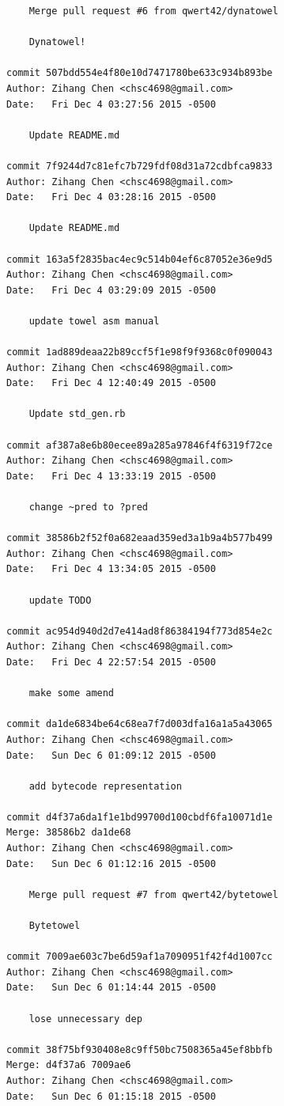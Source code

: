 \documentclass{report}
\begin{document}
\begin{appendices}
\begin{verbatim}
    Merge pull request #6 from qwert42/dynatowel
    
    Dynatowel!

commit 507bdd554e4f80e10d7471780be633c934b893be
Author: Zihang Chen <chsc4698@gmail.com>
Date:   Fri Dec 4 03:27:56 2015 -0500

    Update README.md

commit 7f9244d7c81efc7b729fdf08d31a72cdbfca9833
Author: Zihang Chen <chsc4698@gmail.com>
Date:   Fri Dec 4 03:28:16 2015 -0500

    Update README.md

commit 163a5f2835bac4ec9c514b04ef6c87052e36e9d5
Author: Zihang Chen <chsc4698@gmail.com>
Date:   Fri Dec 4 03:29:09 2015 -0500

    update towel asm manual

commit 1ad889deaa22b89ccf5f1e98f9f9368c0f090043
Author: Zihang Chen <chsc4698@gmail.com>
Date:   Fri Dec 4 12:40:49 2015 -0500

    Update std_gen.rb

commit af387a8e6b80ecee89a285a97846f4f6319f72ce
Author: Zihang Chen <chsc4698@gmail.com>
Date:   Fri Dec 4 13:33:19 2015 -0500

    change ~pred to ?pred

commit 38586b2f52f0a682eaad359ed3a1b9a4b577b499
Author: Zihang Chen <chsc4698@gmail.com>
Date:   Fri Dec 4 13:34:05 2015 -0500

    update TODO

commit ac954d940d2d7e414ad8f86384194f773d854e2c
Author: Zihang Chen <chsc4698@gmail.com>
Date:   Fri Dec 4 22:57:54 2015 -0500

    make some amend

commit da1de6834be64c68ea7f7d003dfa16a1a5a43065
Author: Zihang Chen <chsc4698@gmail.com>
Date:   Sun Dec 6 01:09:12 2015 -0500

    add bytecode representation

commit d4f37a6da1f1e1bd99700d100cbdf6fa10071d1e
Merge: 38586b2 da1de68
Author: Zihang Chen <chsc4698@gmail.com>
Date:   Sun Dec 6 01:12:16 2015 -0500

    Merge pull request #7 from qwert42/bytetowel
    
    Bytetowel

commit 7009ae603c7be6d59af1a7090951f42f4d1007cc
Author: Zihang Chen <chsc4698@gmail.com>
Date:   Sun Dec 6 01:14:44 2015 -0500

    lose unnecessary dep

commit 38f75bf930408e8c9ff50bc7508365a45ef8bbfb
Merge: d4f37a6 7009ae6
Author: Zihang Chen <chsc4698@gmail.com>
Date:   Sun Dec 6 01:15:18 2015 -0500


\end{verbatim}
\end{appendices}
\end{document}
